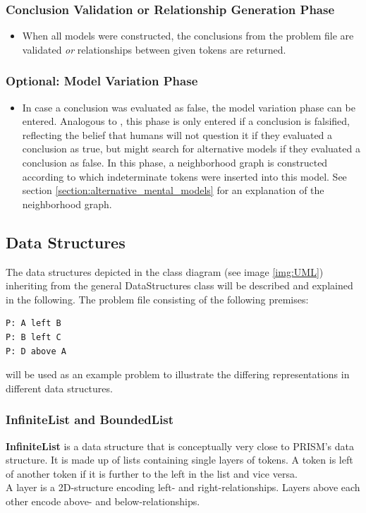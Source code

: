 \documentclass[hidelinks]{scrartcl}
\begin{document}
\subsubsection{Conclusion Validation or Relationship Generation Phase}
\begin{itemize}
\item When all models were constructed, the \gls{conclusion}s from the problem file are validated \textit{or} relationships between given \gls{token}s are returned.
\end{itemize}

\subsubsection{Optional: Model Variation Phase}
\begin{itemize}
\item In case a conclusion was evaluated as false, the model variation phase can be entered. Analogous to \cite{Ragni.2013}, this phase is only entered if a conclusion is falsified, reflecting the belief that humans will not question it if they evaluated a conclusion as true, but might search for alternative models if they evaluated a conclusion as false. In this phase, a neighborhood graph is constructed according to which indeterminate \gls{token}s were inserted into this model. See section \ref{section:alternative_mental_models} for an explanation of the neighborhood graph.
\end{itemize}

\subsection{Data Structures}\label{sec:data_structs}
The data structures depicted in the class diagram (see image \ref{img:UML}) inheriting from the general DataStructures class will be described and explained in the following. The problem file consisting of the following \gls{premise}s:

\begin{lstlisting}[caption=Exemplary problem file, label=pf:example_pf, frame=single]
P: A left B
P: B left C
P: D above A
\end{lstlisting}

\noindent will be used as an example problem to illustrate the differing representations in different data structures.

\subsubsection{InfiniteList and BoundedList}
\textbf{InfiniteList} is a data structure that is conceptually very close to PRISM's data structure. It is made up of lists containing single layers of \gls{token}s. A \gls{token} is left of another \gls{token} if it is further to the left in the list and vice versa. \\
A layer is a 2D-structure encoding left- and right-relationships. Layers above each other encode above- and below-relationships. \\
\end{document}
